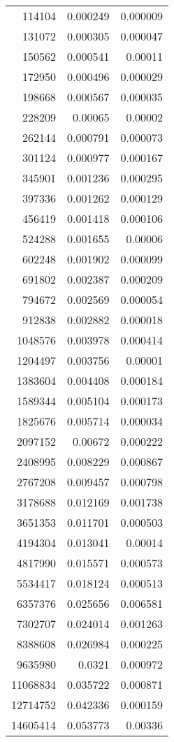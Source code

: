 \begin{tabular}{r r r}
114104 & 0.000249 & 0.000009 \\
131072 & 0.000305 & 0.000047 \\
150562 & 0.000541 & 0.00011 \\
172950 & 0.000496 & 0.000029 \\
198668 & 0.000567 & 0.000035 \\
228209 & 0.00065 & 0.00002 \\
262144 & 0.000791 & 0.000073 \\
301124 & 0.000977 & 0.000167 \\
345901 & 0.001236 & 0.000295 \\
397336 & 0.001262 & 0.000129 \\
456419 & 0.001418 & 0.000106 \\
524288 & 0.001655 & 0.00006 \\
602248 & 0.001902 & 0.000099 \\
691802 & 0.002387 & 0.000209 \\
794672 & 0.002569 & 0.000054 \\
912838 & 0.002882 & 0.000018 \\
1048576 & 0.003978 & 0.000414 \\
1204497 & 0.003756 & 0.00001 \\
1383604 & 0.004408 & 0.000184 \\
1589344 & 0.005104 & 0.000173 \\
1825676 & 0.005714 & 0.000034 \\
2097152 & 0.00672 & 0.000222 \\
2408995 & 0.008229 & 0.000867 \\
2767208 & 0.009457 & 0.000798 \\
3178688 & 0.012169 & 0.001738 \\
3651353 & 0.011701 & 0.000503 \\
4194304 & 0.013041 & 0.00014 \\
4817990 & 0.015571 & 0.000573 \\
5534417 & 0.018124 & 0.000513 \\
6357376 & 0.025656 & 0.006581 \\
7302707 & 0.024014 & 0.001263 \\
8388608 & 0.026984 & 0.000225 \\
9635980 & 0.0321 & 0.000972 \\
11068834 & 0.035722 & 0.000871 \\
12714752 & 0.042336 & 0.000159 \\
14605414 & 0.053773 & 0.00336 \\

\end{tabular}
